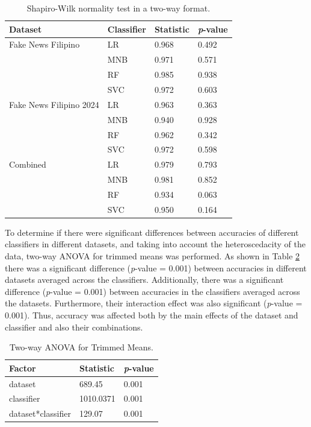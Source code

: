 \begin{table}[ht]
    \centering
    \begin{tabular}{|l|l|l|l|}
    \hline
    Dataset & Classifier & Statistic & \textit{p}-value \\
    \hline
    Fake News Filipino & LR & 0.968 & 0.492 \\
    & MNB & 0.971 & 0.571 \\
    & RF & 0.985 & 0.938 \\
    & SVC & 0.972 & 0.603 \\
    \hline
    Fake News Filipino 2024 & LR & 0.963 & 0.363 \\
    & MNB & 0.940 & 0.928 \\
    & RF & 0.962 & 0.342 \\
    & SVC & 0.972 & 0.598 \\
    \hline
    Combined & LR & 0.979 & 0.793 \\
    & MNB & 0.981 & 0.852 \\
    & RF & 0.934 & 0.063 \\
    & SVC & 0.950 & 0.164 \\
    \hline
    \end{tabular}
\caption{Shapiro-Wilk normality test in a two-way format.}
\label{tab::normality_tests}
\end{table}

To determine if there were significant differences between accuracies of different classifiers in different datasets, and taking into account the heteroscedacity of the data, two-way ANOVA for trimmed means was performed. As shown in Table \ref{tab::two-way} there was a significant difference (\textit{p}-value = 0.001) between accuracies in different datasets averaged across the classifiers. Additionally, there was a significant difference (\textit{p}-value = 0.001) between accuracies in the classifiers averaged across the datasets. Furthermore, their interaction effect was also significant (\textit{p}-value = 0.001). Thus, accuracy was affected both by the main effects of the dataset and classifier and also their combinations.

\begin{table}[ht]
    \centering
    \begin{tabular}{|l|l|l|}
        \hline
        Factor & Statistic & \textit{p}-value \\
        \hline
        dataset & 689.45 & 0.001 \\
        \hline
        classifier & 1010.0371 & 0.001 \\
        \hline
        dataset*classifier & 129.07 & 0.001 \\
        \hline
    \end{tabular}
\caption{Two-way ANOVA for Trimmed Means.}
\label{tab::two-way}
\end{table}

